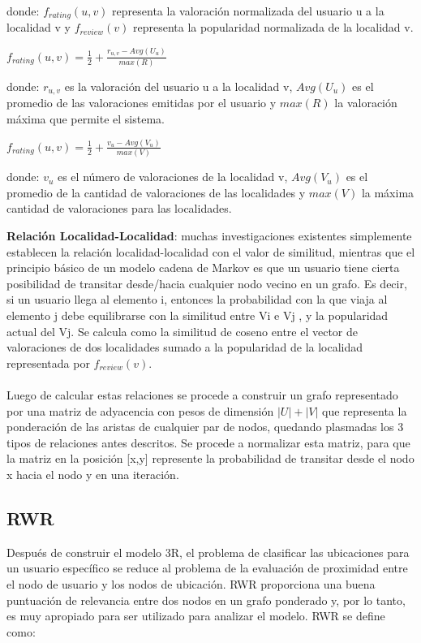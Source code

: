 \documentclass[runningheads]{llncs}
\begin{document}
donde: $f_{rating}(u,v)$ representa la valoración normalizada del usuario u a la localidad v y $f_{review}(v)$ representa la popularidad normalizada de la localidad v.

$f_{rating}(u,v) = \frac{1}{2} + \frac{r_{u,v} - Avg(U_u)}{max(R)}$


donde: $r_{u,v}$ es la valoración del usuario u a la localidad v, $Avg(U_u)$ es el promedio de las valoraciones emitidas por el usuario y $max(R)$ la valoración máxima que permite el sistema.

$f_{rating}(u,v) = \frac{1}{2} + \frac{v_u - Avg(V_u)}{max(V)}$

donde: $v_u$ es el número de valoraciones de la localidad v, $Avg(V_u)$ es el promedio de la cantidad de valoraciones de las localidades y $max(V)$ la máxima cantidad de valoraciones para las localidades.

\textbf{Relación Localidad-Localidad}: muchas investigaciones existentes simplemente establecen la relación localidad-localidad con el valor de similitud, mientras que el principio básico de un modelo cadena de Markov es que un usuario tiene cierta posibilidad de transitar desde/hacia cualquier nodo vecino en un grafo. Es decir, si un usuario llega al elemento i, entonces la probabilidad con la que viaja al elemento j debe equilibrarse con la similitud entre Vi e Vj , y la popularidad actual del Vj. Se calcula como la similitud de coseno entre el vector de valoraciones de dos localidades sumado a la popularidad de la localidad representada por $f_{review}(v)$.
\\
\\
Luego de calcular estas relaciones se procede a construir un grafo representado por una matriz de adyacencia con pesos de dimensión $|U|+|V|$ que representa la ponderación de las aristas de cualquier par de nodos, quedando plasmadas los 3 tipos de relaciones antes descritos. Se procede a normalizar esta matriz, para que la matriz en la posición [x,y] represente la probabilidad de transitar desde el nodo x hacia el nodo y en una iteración.

\subsection{RWR}
Después de construir el modelo 3R, el problema de clasificar las ubicaciones para un usuario específico se reduce al problema de la evaluación de proximidad entre el nodo de usuario y los nodos de ubicación. RWR proporciona una buena puntuación de relevancia entre dos nodos en un grafo ponderado y, por lo tanto, es muy apropiado para ser utilizado para analizar el modelo. RWR se define como: 
\end{document}
